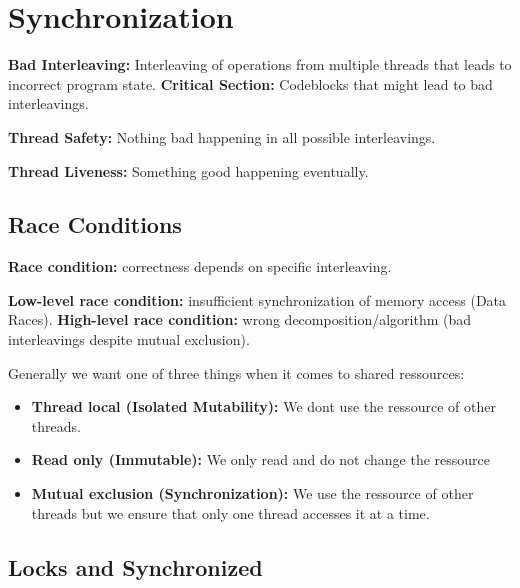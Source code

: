 \section{Synchronization}


\begin{definition}
\textbf{Bad Interleaving:} Interleaving of operations from multiple threads that leads to incorrect program state.
\textbf{Critical Section:} Codeblocks that might lead to bad interleavings.
\end{definition}

\begin{definition}
\textbf{Thread Safety:} Nothing bad happening in all possible interleavings.
\end{definition}

\begin{definition}
\textbf{Thread Liveness:} Something good happening eventually.
\end{definition}

\subsection{Race Conditions}

\begin{definition}
\textbf{Race condition: } correctness depends on specific interleaving.
\end{definition}

\begin{definition}
\textbf{Low-level race condition: } insufficient synchronization of memory access (Data Races).
\textbf{High-level race condition: } wrong decomposition/algorithm (bad interleavings despite mutual exclusion).
\end{definition}

Generally we want one of three things when it comes to shared ressources:
\begin{itemize}
    \item \textbf{Thread local (Isolated Mutability):} We dont use the ressource of other threads.
    \item \textbf{Read only (Immutable):} We only read and do not change the ressource
    \item \textbf{Mutual exclusion (Synchronization):} We use the ressource of other threads but we ensure that only one thread accesses it at a time.
\end{itemize}

\subsection{Locks and Synchronized}

